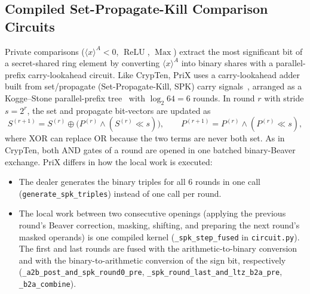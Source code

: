 \documentclass[11pt]{article}
\newcommand{\shareA}[1]{\langle #1 \rangle^{A}}
\begin{document}
\subsection{Compiled Set-Propagate-Kill Comparison Circuits}
\label{sec:koggestone}
Private comparisons ($\shareA{x} < 0$, $\operatorname{ReLU}$, $\operatorname{Max}$) extract the most significant bit of a secret-shared ring element by converting $\shareA{x}$ into binary shares with a parallel-prefix carry-lookahead circuit. Like CrypTen, PriX uses a carry-lookahead adder built from set/propagate (Set-Propagate-Kill, SPK) carry signals~\cite{damgard2006unconditionally}, arranged as a Kogge--Stone parallel-prefix tree~\cite{kogge1973parallel} with $\log_2 64 = 6$ rounds. In round $r$ with stride $s = 2^r$, the set and propagate bit-vectors are updated as
\begin{equation}
    S^{(r+1)} = S^{(r)} \oplus \big(P^{(r)} \wedge (S^{(r)} \ll s)\big), \qquad
    P^{(r+1)} = P^{(r)} \wedge (P^{(r)} \ll s),
\end{equation}
where XOR can replace OR because the two terms are never both set. As in CrypTen, both AND gates of a round are opened in one batched binary-Beaver exchange. PriX differs in how the local work is executed:
\begin{itemize}
    \item The dealer generates the binary triples for all 6 rounds in one call (\texttt{generate\_spk\_triples}) instead of one call per round.
    \item The local work between two consecutive openings (applying the previous round's Beaver correction, masking, shifting, and preparing the next round's masked operands) is one compiled kernel (\texttt{\_spk\_step\_fused} in \texttt{circuit.py}). The first and last rounds are fused with the arithmetic-to-binary conversion and with the binary-to-arithmetic conversion of the sign bit, respectively (\texttt{\_a2b\_post\_and\_spk\_round0\_pre}, \texttt{\_spk\_round\_last\_and\_ltz\_b2a\_pre}, \texttt{\_b2a\_combine}).
\end{itemize}
\end{document}

